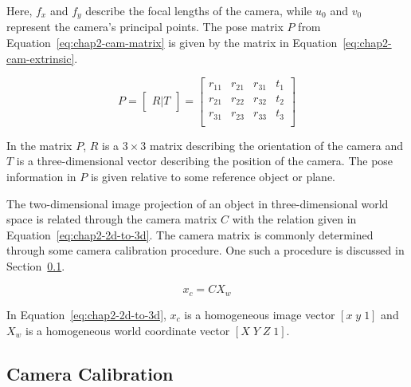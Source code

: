 Here, $f_x$ and $f_y$ describe the focal lengths of the camera, while $u_0$ and $v_0$ represent the camera's principal points. The pose matrix $P$ from Equation~\ref{eq:chap2-cam-matrix} is given by the matrix in Equation~\ref{eq:chap2-cam-extrinsic}.

\begin{equation}
  \label{eq:chap2-cam-extrinsic}
  P = 
  \begin{bmatrix}
    R | T
  \end{bmatrix}
  =
  \begin{bmatrix}
    r_{11} & r_{21} & r_{31} & t_1 \\
    r_{21} & r_{22} & r_{32} & t_2 \\
    r_{31} & r_{23} & r_{33} & t_3 \\
  \end{bmatrix}
\end{equation}

In the matrix $P$, $R$ is a $3\times3$ matrix describing the orientation of the camera and $T$ is a three-dimensional vector describing the position of the camera. The pose information in $P$ is given relative to some reference object or plane. 

The two-dimensional image projection of an object in three-dimensional world space is related through the camera matrix $C$ with the relation given in Equation~\ref{eq:chap2-2d-to-3d}. The camera matrix is commonly determined through some camera calibration procedure. One such a procedure is discussed in Section~\ref{sec:chap2-cam-calibration}.

\begin{equation}
  \label{eq:chap2-2d-to-3d}
  x_c
  = C
  X_w
\end{equation}

In Equation~\ref{eq:chap2-2d-to-3d}, $x_c$ is a homogeneous image vector $[x\;y\;1]$ and $X_w$ is a homogeneous world coordinate vector $[X\;Y\;Z\;1]$. 

\subsection{Camera Calibration}
\label{sec:chap2-cam-calibration}


